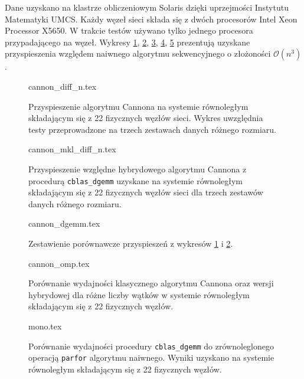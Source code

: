 Dane uzyskano na klastrze obliczeniowym Solaris dzięki uprzejmości Instytutu Matematyki UMCS. Każdy węzeł sieci składa się z dwóch procesorów Intel Xeon Processor X5650. W trakcie testów używano tylko jednego procesora przypadającego na węzeł. Wykresy \ref{pl:cannon_seq_diff}, \ref{pl:cannon_dgemm_diff}, \ref{pl:compar_dgemm}, \ref{pl:cannon_omp}, \ref{pl:mono} prezentują uzyskane przyspieszenia względem naiwnego algorytmu sekwencyjnego o złożoności \(\mathcal{O}(n^3)\).

\begin{figure}[hb]
\centering
\footnotesize
{cannon_diff_n.tex}
\caption{Przyspieszenie algorytmu Cannona na systemie równoległym składającym się z 22 fizycznych węzłów sieci. Wykres uwzględnia testy przeprowadzone na trzech zestawach danych różnego rozmiaru.}
\label{pl:cannon_seq_diff}
\end{figure}

\begin{figure}[hb]
\centering
\footnotesize
{cannon_mkl_diff_n.tex}
\caption{Przyspieszenie względne hybrydowego algorytmu Cannona z procedurą \texttt{cblas\_dgemm} uzyskane na systemie równoległym składającym się z 22 fizycznych węzłów sieci dla trzech zestawów danych różnego rozmiaru.}
\label{pl:cannon_dgemm_diff}
\end{figure}

\begin{figure}[hb]
\centering
\footnotesize
{cannon_dgemm.tex}
\caption{Zestawienie porównawcze przyspieszeń z wykresów \ref{pl:cannon_seq_diff} i \ref{pl:cannon_dgemm_diff}.} 
\label{pl:compar_dgemm}
\end{figure}

\begin{figure}[hb]
\centering
\footnotesize
{cannon_omp.tex}
\caption{Porównanie wydajności klasycznego algorytmu Cannona oraz wersji hybrydowej dla różne liczby wątków w systemie równoległym składającym się z 22 fizycznych węzłów.}
\label{pl:cannon_omp}
\end{figure}

\begin{figure}[hb]
\centering
\footnotesize
{mono.tex}
\caption{Porównanie wydajności procedury \texttt{cblas\_dgemm} do zrównoleglonego operacją \texttt{parfor} algorytmu naiwnego. Wyniki uzyskano na systemie równoległym składającym się z 22 fizycznych węzłów.}
\label{pl:mono}
\end{figure}